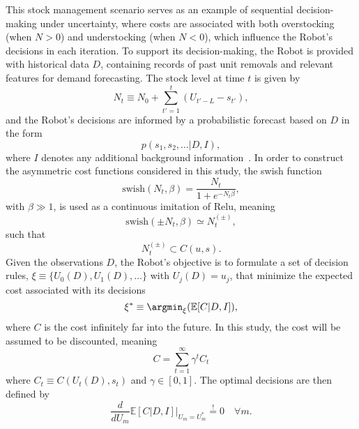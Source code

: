 This stock management scenario serves as an example of sequential decision-making under uncertainty, where costs are associated with both overstocking (when $N > 0$) and understocking (when $N < 0$), which influence the Robot's decisions in each iteration. To support its decision-making, the Robot is provided with historical data $D$, containing records of past unit removals and relevant features for demand forecasting. The stock level at time $t$ is given by  
\begin{equation}
	N_t \equiv N_0 + \sum_{t'=1}^{t} (U_{t'-L} - s_{t'}),
\end{equation}
and the Robot's decisions are informed by a probabilistic forecast based on $D$ in the form  
\begin{equation}
	p(s_1, s_2, \dots | D, I),
	\label{eq:prob_forecast}
\end{equation}
where $I$ denotes any additional background information~\citep{Sivia2006}. In order to construct the asymmetric cost functions considered in this study, the swish function
\begin{equation}
	\text{swish}(N_t,\beta) = \frac{N_t}{1+e^{-N_t\beta}},
\end{equation}
with $\beta\gg 1 $, is used as a continuous imitation of Relu, meaning
\begin{equation}
	\text{swish}(\pm N_t,\beta) \simeq N_t^{(\pm)},
\end{equation}
such that
\begin{equation}
	N_t^{(\pm)}\subset C(u,s).
\end{equation}
Given the observations $D$, the Robot's objective is to formulate a set of decision rules, $\xi\equiv \{U_0(D),U_1(D),\dots\}$ with  $U_j(D)=u_j$, that minimize the expected cost associated with its decisions
\begin{equation}
	\xi^*\equiv \argmin_{\xi}(\mathbb{E}[C|D,I]),
\end{equation}
where $C$ is the cost infinitely far into the future. In this study, the cost will be assumed to be discounted, meaning
\begin{equation}
	C = \sum_{t=1}^{\infty}\gamma^{t}C_t
\end{equation}
where $C_t \equiv C(U_t(D),s_t)$ and $\gamma\in [0,1]$. The optimal decisions are then defined by
\begin{equation}
\frac{d}{dU_m}\mathbb{E}[C|D,I]\bigg|_{U_m = U_m^*} \overset{!}{=} 0\quad \forall m.
\label{eq:min_exp_cost}
\end{equation}

